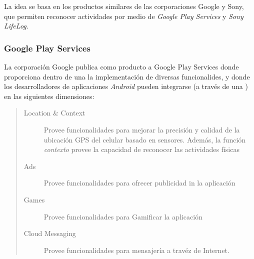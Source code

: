 La idea se basa en los productos similares de las corporaciones Google y Sony, que permiten reconocer actividades por medio de \emph{Google Play Services} y \emph{Sony LifeLog}.

\subsubsection{Google Play Services}
\label{intro:har-google-play-services}\label{intro:google-play-services}
La corporación Google publica como producto a Google Play Services \cite{Google2016ps} donde proporciona dentro de una  la implementación de diversas funcionalides, y donde los desarrolladores de aplicaciones
\emph{Android} pueden integrarse (a través de una  \cite{Google2016l}) en las siguientes dimensiones:
\begin{quote}
\begin{description}
\item[{Location \& Context}] \leavevmode
Provee funcionalidades para mejorar la precisión y calidad de la ubicación GPS del celular basado en sensores.
Además, la función \emph{contexto} provee la capacidad de reconocer las actividades físicas

\item[{Ads}] \leavevmode
Provee funcionalidades para ofrecer publicidad in la aplicación

\item[{Games}] \leavevmode
Provee funcionalidades para Gamificar la aplicación

\item[{Cloud Messaging}] \leavevmode
Provee funcionalidades para mensajería a travéz de Internet.

\end{description}

\end{quote}

